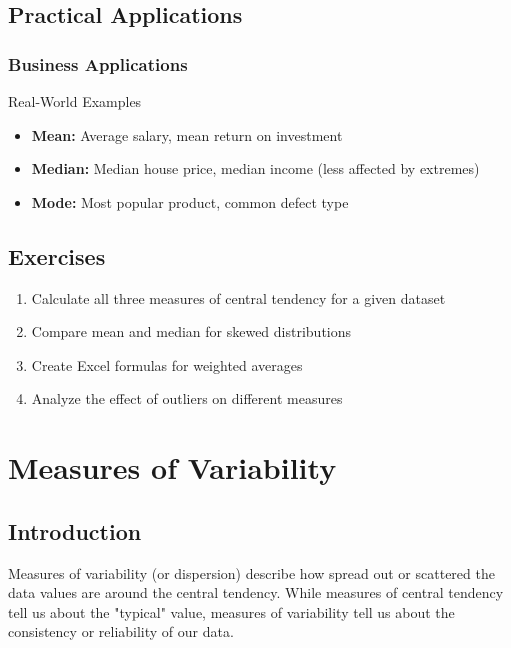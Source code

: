 \documentclass[12pt,a4paper]{book}
\begin{document}
\section{Practical Applications}

\subsection{Business Applications}

\begin{example}{Real-World Examples}
\begin{itemize}
    \item \textbf{Mean:} Average salary, mean return on investment
    \item \textbf{Median:} Median house price, median income (less affected by extremes)
    \item \textbf{Mode:} Most popular product, common defect type
\end{itemize}
\end{example}

\section{Exercises}

\begin{enumerate}
    \item Calculate all three measures of central tendency for a given dataset
    \item Compare mean and median for skewed distributions
    \item Create Excel formulas for weighted averages
    \item Analyze the effect of outliers on different measures
\end{enumerate}

\chapter{Measures of Variability}

\section{Introduction}

Measures of variability (or dispersion) describe how spread out or scattered the data values are around the central tendency. While measures of central tendency tell us about the "typical" value, measures of variability tell us about the consistency or reliability of our data.
\end{document}
